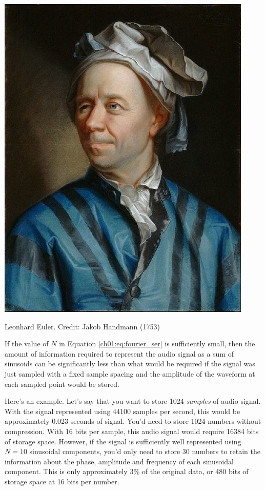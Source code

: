 \begin{marginfigure}
\begin{center}
  \includegraphics[width=\textwidth]{ch01/figures/euler.jpg}
\end{center}
\caption{Leonhard Euler. Credit: Jakob Handmann (1753)}
\label{fig:euler_pic}
\end{marginfigure}

If the value of $N$ in Equation \ref{ch01:eq:fourier_ser} is
sufficiently small, then the amount of information required to
represent the audio signal as a sum of sinusoids can be significantly
less than what would be required if the signal was just sampled with a
fixed sample spacing and the amplitude of the waveform at each sampled
point would be stored.

Here's an example. Let's say that you want to store 1024 \emph{samples} of
audio signal. With the signal represented using 44100 samples per second,
this would be approximately 0.023 seconds of signal. You'd need to
store 1024 numbers without compression. With 16 bits per sample, this
audio signal would require 16384 bits of storage space. However, if
the signal is sufficiently well represented using $N=10$ sinusoidal
components, you'd only need to store 30 numbers to retain the
information about the phase, amplitude and frequency of each
sinusoidal component. This is only approximately 3\% of the original
data, or 480 bits of storage space at 16 bits per number.

